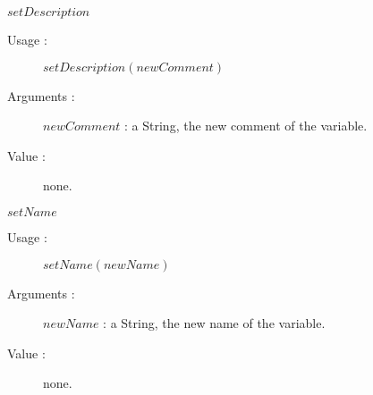 \begin{description}
\begin{description}
  \item $setDescription$
    \begin{description}
    \item[Usage :]  $setDescription(newComment)$
    \item[Arguments :] $newComment$ : a String, the new comment of the variable.
    \item[Value :]  none.
    \end{description}
    \bigskip

  \item $setName$
    \begin{description}
    \item[Usage :]  $setName(newName)$
    \item[Arguments :] $newName$ :  a String, the new name of the variable.
    \item[Value :]  none.
    \end{description}

  \end{description}


\end{description}




